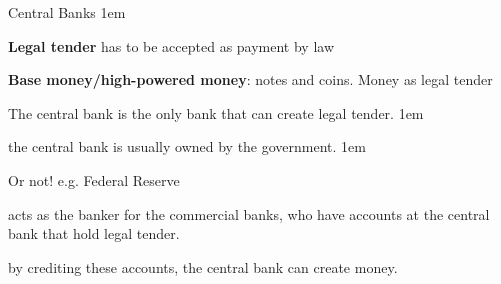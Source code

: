 \documentclass[11pt,aspectratio=43,usenames,dvipsnames]{beamer}
\let\olditemize=\itemize
\let\endolditemize=\enditemize
\renewenvironment{itemize}{\olditemize \itemsep1em}{\endolditemize}
\theoremstyle{definition}
\begin{document}
\begin{frame}{Central Banks}
\label{slide:Central_Banks}
    \begin{itemize}
        \item \textbf{Legal tender} has to be accepted as payment by law
        \item \textbf{Base money/high-powered money}: notes and coins. Money as legal tender
        \item The central bank is the only bank that can \alert{create} legal tender.
        \begin{itemize}
            \item the central bank is usually owned by the government.
            \begin{itemize}
                \item Or not! e.g. \alert{Federal Reserve}
            \end{itemize}
            \item acts as the banker for the commercial banks, who have accounts at the central bank that hold legal tender.
            \item by crediting these accounts, the central bank can create money.
        \end{itemize}

    \end{itemize}

\end{frame}
\end{document}
